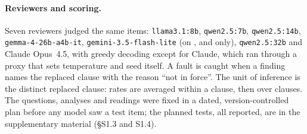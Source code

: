 \paragraph{Reviewers and scoring.}
Seven reviewers judged the same items: \texttt{llama3.1:8b}, \texttt{qwen2.5:7b}, \texttt{qwen2.5:14b},
\texttt{gemma-4-26b-a4b-it}, \texttt{gemini-3.5-flash-lite} (on ,  and  only),
\texttt{qwen2.5:32b} and Claude Opus~4.5, with greedy decoding except for Claude, which ran through a proxy that sets
temperature and seed itself. A fault is caught when a finding names the replaced
clause with the reason ``not in force''. The unit of inference is the distinct replaced clause: rates are averaged within
a clause, then over clauses. The questions, analyses and readings were fixed in a dated, version-controlled plan before
any model saw a test item; the planned tests, all reported, are in the supplementary material (\S S1.3 and S1.4).

